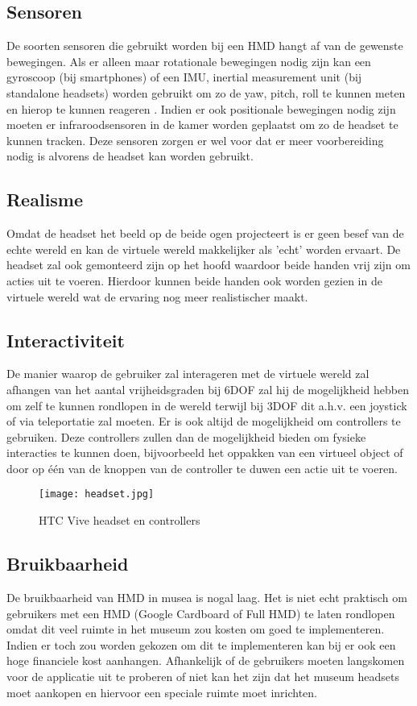 \subsection{Sensoren}
De soorten sensoren die gebruikt worden bij een HMD hangt af van de gewenste bewegingen. Als er alleen maar rotationale bewegingen nodig zijn kan een gyroscoop (bij smartphones) of een IMU, inertial measurement unit (bij standalone headsets) worden gebruikt om zo de yaw, pitch, roll te kunnen meten en hierop te kunnen reageren \autocite{LaValle2014}. Indien er ook positionale bewegingen nodig zijn moeten er infraroodsensoren in de kamer worden geplaatst om zo de headset te kunnen tracken. Deze sensoren zorgen er wel voor dat er meer voorbereiding nodig is alvorens de headset kan worden gebruikt.
\subsection{Realisme}
Omdat de headset het beeld op de beide ogen projecteert is er geen besef van de echte wereld en kan de virtuele wereld makkelijker als 'echt' worden ervaart. De headset zal ook gemonteerd zijn op het hoofd waardoor beide handen vrij zijn om acties uit te voeren. Hierdoor kunnen beide handen ook worden gezien in de virtuele wereld wat de ervaring nog meer realistischer maakt.
\subsection{Interactiviteit}
De manier waarop de gebruiker zal interageren met de virtuele wereld zal afhangen van het aantal vrijheidsgraden bij 6DOF zal hij de mogelijkheid hebben om zelf te kunnen rondlopen in de wereld terwijl bij 3DOF dit a.h.v. een joystick of via teleportatie zal moeten. Er is ook altijd de mogelijkheid om controllers te gebruiken. Deze controllers zullen dan de mogelijkheid bieden om fysieke interacties te kunnen doen, bijvoorbeeld het oppakken van een virtueel object of door op één van de knoppen van de controller te duwen een actie uit te voeren.

\begin{figure}
    \texttt{[image: headset.jpg]}
    \caption{HTC Vive headset en controllers}
    \label{fig:htcvive}
\end{figure}

\subsection{Bruikbaarheid}
De bruikbaarheid van HMD in musea is nogal laag. Het is niet echt praktisch om gebruikers met een HMD (Google Cardboard of Full HMD) te laten rondlopen omdat dit veel ruimte in het museum zou kosten om goed te implementeren. Indien er toch zou worden gekozen om dit te implementeren kan bij er ook een hoge financiele kost aanhangen. Afhankelijk of de gebruikers moeten langskomen voor de applicatie uit te proberen of niet kan het zijn dat het museum headsets moet aankopen en hiervoor een speciale ruimte moet inrichten.


